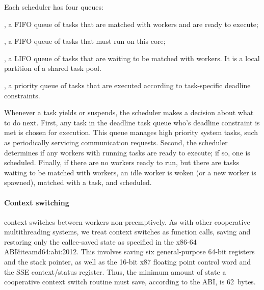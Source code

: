 Each scheduler has four queues:

, a FIFO queue of tasks that are
  matched with workers and are ready to execute;

, a FIFO queue of tasks that must run on this core;

,  a LIFO queue of tasks that are
  waiting to be matched with workers. It is a local partition of a shared
  task pool.

, a priority queue of tasks that are executed according to task-specific deadline constraints.

Whenever a task yields or suspends, the scheduler makes a decision about what
to do next. First, any task in the deadline task queue who's deadline
constraint is met is chosen for execution. This queue manages high priority
system tasks, such as periodically servicing communication requests. Second,
the scheduler determines if any workers with running tasks are ready to
execute; if so, one is scheduled. Finally, if there are no workers ready to
run, but there are tasks waiting to be matched with workers, an idle worker is
woken (or a new worker is spawned), matched with a task, and scheduled.

\paragraph{Context switching} 
\Grappa context switches between workers non-preemptively. As with other
cooperative multithreading systems, we treat context switches as function
calls, saving and restoring only the callee-saved state as specified in the
x86-64 ABI\~cite{amd64:abi:2012}. This involves saving six general-purpose
64-bit registers and the stack pointer, as well as the 16-bit x87 floating
point control word and the SSE context/status register. Thus, the minimum
amount of state a cooperative context switch routine must save, according to
the ABI, is 62~bytes.



%

